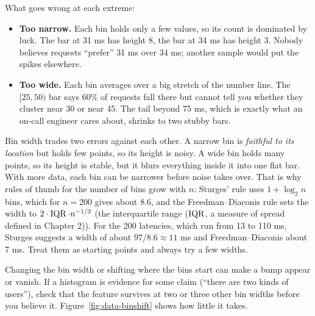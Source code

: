 What goes wrong at each extreme:

\begin{itemize}
  \item \textbf{Too narrow.} Each bin holds only a few values, so its count is dominated by
  luck. The bar at 31 ms has height 8, the bar at 34 ms has height 3. Nobody believes requests
  ``prefer'' 31 ms over 34 ms; another sample would put the spikes elsewhere.
  \item \textbf{Too wide.} Each bin averages over a big stretch of the number line. The
  $[25,50)$ bar says 60\% of requests fall there but cannot tell you whether they cluster near
  30 or near 45. The tail beyond 75 ms, which is exactly what an on-call engineer cares about,
  shrinks to two stubby bars.
\end{itemize}

\begin{whybox}
Bin width trades two errors against each other. A narrow bin is \emph{faithful to its location}
but holds few points, so its height is noisy. A wide bin holds many points, so its height is
stable, but it blurs everything inside it into one flat bar. With more data, each bin can be
narrower before noise takes over. That is why rules of thumb for the number of bins grow with
$n$: Sturges' rule uses $1+\log_2 n$ bins, which for $n=200$ gives about $8.6$, and the
Freedman--Diaconis rule sets the width to $2\cdot\operatorname{IQR}\cdot n^{-1/3}$ (the interquartile range ($\operatorname{IQR}$, a measure of
spread defined in Chapter 2)). For the 200 latencies, which run from 13 to 110 ms, Sturges
suggests a width of about $97/8.6\approx 11$ ms and Freedman--Diaconis about 7 ms. Treat them
as starting points and always try a few widths.
\end{whybox}

\begin{trapbox}
Changing the bin width or shifting where the bins start can make a bump appear or vanish.
If a histogram is evidence for some claim (``there are two kinds of users''), check that the
feature survives at two or three other bin widths before you believe it.
Figure~\ref{fig:data-binshift} shows how little it takes.
\end{trapbox}

